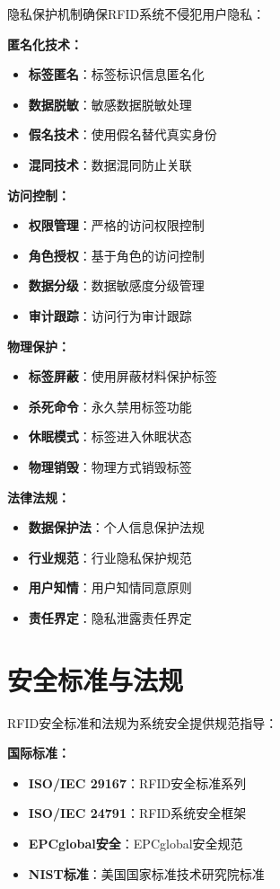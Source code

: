 \documentclass[12pt,UTF8]{ctexbook}
\begin{document}
\begin{itemize}[leftmargin=3.5em]
\begin{itemize}[leftmargin=3.5em]
\begin{itemize}[leftmargin=3.5em]
\begin{itemize}[leftmargin=3.5em]
隐私保护机制确保RFID系统不侵犯用户隐私：

\textbf{匿名化技术：}
\begin{itemize}[leftmargin=3.5em]
    \item \textbf{标签匿名}：标签标识信息匿名化
    \item \textbf{数据脱敏}：敏感数据脱敏处理
    \item \textbf{假名技术}：使用假名替代真实身份
    \item \textbf{混同技术}：数据混同防止关联
\end{itemize}

\textbf{访问控制：}
\begin{itemize}[leftmargin=3.5em]
    \item \textbf{权限管理}：严格的访问权限控制
    \item \textbf{角色授权}：基于角色的访问控制
    \item \textbf{数据分级}：数据敏感度分级管理
    \item \textbf{审计跟踪}：访问行为审计跟踪
\end{itemize}

\textbf{物理保护：}
\begin{itemize}[leftmargin=3.5em]
    \item \textbf{标签屏蔽}：使用屏蔽材料保护标签
    \item \textbf{杀死命令}：永久禁用标签功能
    \item \textbf{休眠模式}：标签进入休眠状态
    \item \textbf{物理销毁}：物理方式销毁标签
\end{itemize}

\textbf{法律法规：}
\begin{itemize}[leftmargin=3.5em]
    \item \textbf{数据保护法}：个人信息保护法规
    \item \textbf{行业规范}：行业隐私保护规范
    \item \textbf{用户知情}：用户知情同意原则
    \item \textbf{责任界定}：隐私泄露责任界定
\end{itemize}

\section{安全标准与法规}

RFID安全标准和法规为系统安全提供规范指导：

\textbf{国际标准：}
\begin{itemize}[leftmargin=3.5em]
    \item \textbf{ISO/IEC 29167}：RFID安全标准系列
    \item \textbf{ISO/IEC 24791}：RFID系统安全框架
    \item \textbf{EPCglobal安全}：EPCglobal安全规范
    \item \textbf{NIST标准}：美国国家标准技术研究院标准
\end{itemize}


\end{itemize}
\end{itemize}
\end{itemize}
\end{itemize}
\end{document}
